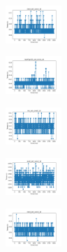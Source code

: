 \begin{figure}[H]
    \begin{subfigure}
        \centering
        \includegraphics[width=0.234\textwidth]{img/aggun/rand_set_const_10_277451237_time.png}
    \end{subfigure}
    \hfill
    \begin{subfigure}
        \centering
        \includegraphics[width=0.234\textwidth]{img/aggun/newthyroid_set_const_10_277451237_time.png}
    \end{subfigure}
    \hfill
    \begin{subfigure}
        \centering
        \includegraphics[width=0.234\textwidth]{img/aggun/iris_set_const_10_49258669_time.png}
    \end{subfigure}
    \hfill
    \begin{subfigure}
        \centering
        \includegraphics[width=0.234\textwidth]{img/aggun/ecoli_set_const_10_49258669_time.png}
    \end{subfigure}
    \hfill
    \begin{subfigure}
        \centering
        \includegraphics[width=0.234\textwidth]{img/aggun/rand_set_const_10_49258669_time.png}
    \end{subfigure}
    \hfill
    \begin{subfigure}
        \centering

\end{subfigure}
\end{figure}
